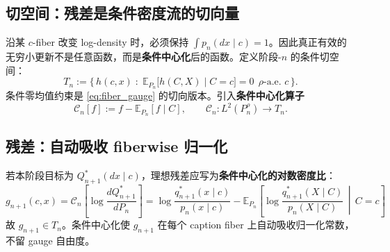 \documentclass[11pt,a4paper]{article}
\newcommand{\E}{\mathbb{E}}
\newcommand{\Center}{\mathcal{C}}
\begin{document}
\subsection{切空间：残差是条件密度流的切向量}

沿某 $c$-fiber 改变 log-density 时，必须保持 $\int p_n(dx\mid c)=1$。因此真正有效的无穷小更新不是任意函数，而是\textbf{条件中心化}后的函数。定义阶段-$n$ 的条件切空间：
\begin{equation}\label{eq:tangent_space}
\boxed{
T_n := \bigl\{\, h(c,x) \;:\; \E_{P_n}\!\bigl[h(C,X)\mid C=c\bigr]=0 \ \ \rho\text{-a.e. }c \,\bigr\}.
}
\end{equation}
条件零均值约束是 \eqref{eq:fiber_gauge} 的切向版本。引入\textbf{条件中心化算子}
\begin{equation}\label{eq:centering}
\Center_n[f] := f - \E_{P_n}[f\mid C],\qquad \Center_n: L^2(P_n^\rho)\to T_n.
\end{equation}

\subsection{残差：自动吸收 fiberwise 归一化}

若本阶段目标为 $Q^*_{n+1}(dx\mid c)$，理想残差应写为\textbf{条件中心化的对数密度比}：
\begin{equation}\label{eq:cond_residual}
\boxed{
g_{n+1}(c,x) = \Center_n\!\left[\log\frac{dQ^*_{n+1}}{dP_n}\right] = \log\frac{q^*_{n+1}(x\mid c)}{p_n(x\mid c)} - \E_{P_n}\!\left[\log\frac{q^*_{n+1}(X\mid C)}{p_n(X\mid C)}\,\middle|\,C=c\right]
}
\end{equation}
故 $g_{n+1}\in T_n$。条件中心化使 $g_{n+1}$ 在每个 caption fiber 上自动吸收归一化常数，不留 gauge 自由度。
\end{document}
